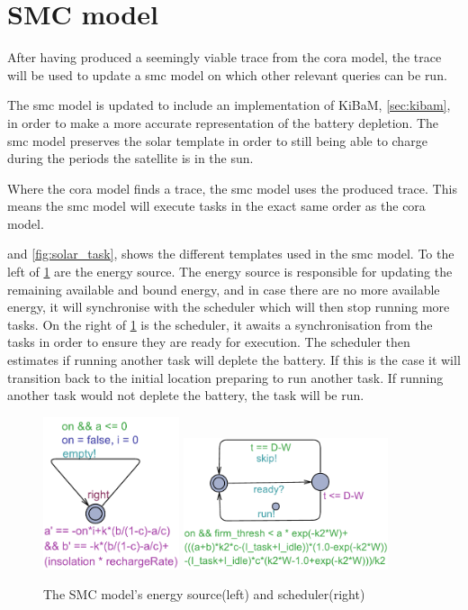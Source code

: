 \section{SMC model}
After having produced a seemingly viable trace from the \gls{cora} model, the trace will be used to update a \gls{smc} model on which other relevant queries can be run.

The \gls{smc} model is updated to include an implementation of KiBaM, \cref{sec:kibam}, in order to make a more accurate representation of the battery depletion. The \gls{smc} model preserves the solar template in order to still being able to charge during the periods the satellite is in the sun.

Where the \gls{cora} model finds a trace, the \gls{smc} model uses the produced trace. This means the \gls{smc} model will execute tasks in the exact same order as the \gls{cora} model.%

 and \cref{fig:solar_task}, shows the different templates used in the \gls{smc} model. To the left of \cref{fig:cost_schedule} are the energy source. The energy source is responsible for updating the remaining available and bound energy, and in case there are no more available energy, it will synchronise with the scheduler which will then stop running more tasks.
On the right of \cref{fig:cost_schedule} is the scheduler, it awaits a synchronisation from the tasks in order to ensure they are ready for execution. The scheduler then estimates if running another task will deplete the battery. If this is the case it will transition back to the initial location preparing to run another task. If running another task would not deplete the battery, the task will be run.

\begin{figure}[H]%
	\centering
	\subfloat
	{{\includegraphics[width=4cm]{graphics/smc_costhandler.pdf} }}%
	\qquad
	\subfloat
	{{\includegraphics[width=6cm]{graphics/smc_scheduler.pdf} }}%
	\caption{The SMC model's energy source(left) and scheduler(right)}%
	\label{fig:cost_schedule}%
\end{figure}

